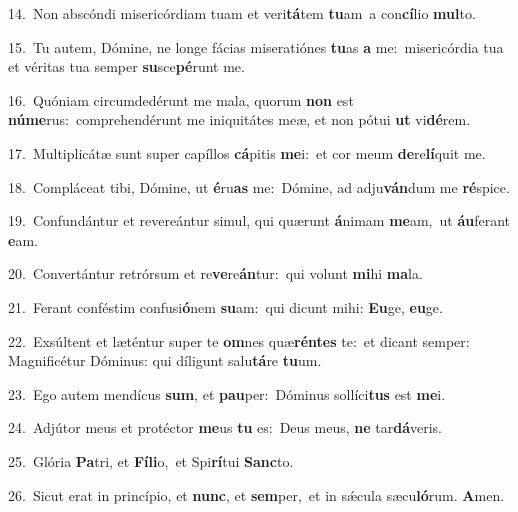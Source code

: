 {\numbfont\textcolor{\numbcolor}{14.}}~Non abscóndi misericórdiam tuam et veri\-\textbf{tá}\-tem \textbf{tu}\-am~\star a con\-\textbf{cí}\-lio \textbf{mul}\-to.\par
{\numbfont\textcolor{\numbcolor}{15.}}~Tu autem, Dómine, ne longe fácias miseratiónes \textbf{tu}\-as \textbf{a} me:~\star misericórdia tua et véritas tua semper \textbf{su}\-sce\-\textbf{pé}\-runt me.\par
{\numbfont\textcolor{\numbcolor}{16.}}~Quóniam circumdedérunt me mala, quorum \textbf{non} est \textbf{nú}\-\textbf{me}rus:~\star comprehendérunt me iniquitátes meæ, et non pótui \textbf{ut} vi\-\textbf{dé}\-rem.\par
{\numbfont\textcolor{\numbcolor}{17.}}~Multiplicátæ sunt super capíllos \textbf{cá}\-pitis \textbf{me}\-i:~\star et cor meum \textbf{de}\-re\-\textbf{lí}\-quit me.\par
{\numbfont\textcolor{\numbcolor}{18.}}~Compláceat tibi, Dómine, ut \textbf{é}\-ru\textbf{as} me:~\star Dómine, ad adju\-\textbf{ván}\-dum me \textbf{ré}\-spice.\par
{\numbfont\textcolor{\numbcolor}{19.}}~Confundántur et revereántur simul, qui quærunt \textbf{á}\-nimam \textbf{me}\-am,~\star ut \textbf{áu}\-ferant \textbf{e}\-am.\par
{\numbfont\textcolor{\numbcolor}{20.}}~Convertántur retrórsum et re\-\textbf{ve}\-re\-\textbf{án}\-tur:~\star qui volunt \textbf{mi}\-hi \textbf{ma}\-la.\par
{\numbfont\textcolor{\numbcolor}{21.}}~Ferant conféstim confusi\-\textbf{ó}\-nem \textbf{su}\-am:~\star qui dicunt mihi: \textbf{Eu}\-ge, \textbf{eu}\-ge.\par
{\numbfont\textcolor{\numbcolor}{22.}}~Exsúltent et læténtur super te \textbf{om}\-nes quæ\-\textbf{rén}\-\textbf{tes} te:~\star et dicant semper: Magnificétur Dóminus: qui díligunt salu\-\textbf{tá}\-re \textbf{tu}\-um.\par
{\numbfont\textcolor{\numbcolor}{23.}}~Ego autem mendícus \textbf{sum}\-, et \textbf{pau}\-per:~\star Dóminus sollíci\textbf{tus} est \textbf{me}\-i.\par
{\numbfont\textcolor{\numbcolor}{24.}}~Adjútor meus et protéctor \textbf{me}\-us \textbf{tu} es:~\star Deus meus, \textbf{ne} tar\-\textbf{dá}\-veris.\par
{\numbfont\textcolor{\numbcolor}{25.}}~Glória \textbf{Pa}\-tri, et \textbf{Fí}\-\textbf{li}o,~\star et Spi\-\textbf{rí}\-tui \textbf{Sanc}\-to.\par
{\numbfont\textcolor{\numbcolor}{26.}}~Sicut erat in princípio, et \textbf{nunc}\-, et \textbf{sem}\-per,~\star et in sǽcula sæcu\-\textbf{ló}\-rum. \textbf{A}\-men.\par
